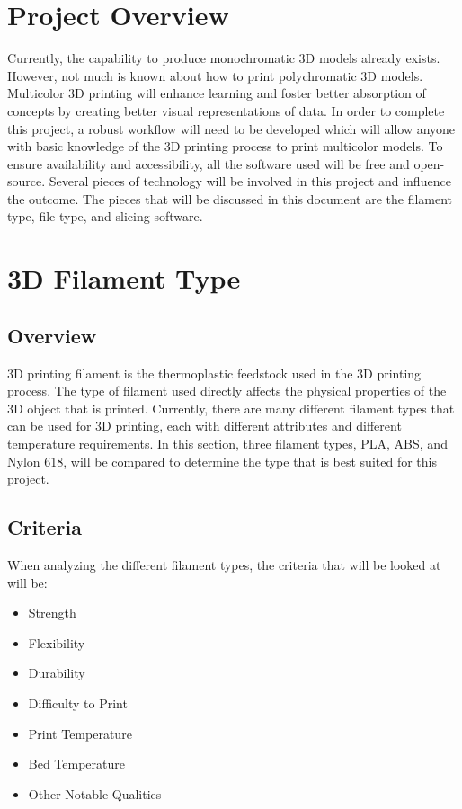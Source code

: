 \documentclass[letterpaper, onecolumn, draftclsnofoot,10pt, compsoc]{IEEEtran}
\begin{document}
\newpage
{}
\tableofcontents
\clearpage

\section{Project Overview} 
Currently, the capability to produce monochromatic 3D models already exists. 
However, not much is known about how to print polychromatic 3D models.
Multicolor 3D printing will enhance learning and foster better absorption of concepts by creating better visual representations of data. 
In order to complete this project, a robust workflow will need to be developed which will allow anyone with basic knowledge of the 3D printing process to print multicolor models.
To ensure availability and accessibility, all the software used will be free and open-source.
Several pieces of technology will be involved in this project and influence the outcome. 
The pieces that will be discussed in this document are the filament type, file type, and slicing software.


\section{3D Filament Type}
\subsection{Overview}
3D printing filament is the thermoplastic feedstock used in the 3D printing process.
The type of filament used directly affects the physical properties of the 3D object that is printed. 
Currently, there are many different filament types that can be used for 3D printing, each with different attributes and different temperature requirements.
In this section, three filament types, PLA, ABS, and Nylon 618, will be compared to determine the type that is best suited for this project. 
\subsection{Criteria}
When analyzing the different filament types, the criteria that will be looked at will be: 
\begin{itemize}
\item Strength
\item Flexibility
\item Durability
\item Difficulty to Print
\item Print Temperature
\item Bed Temperature
\item Other Notable Qualities
\end{itemize}
\end{document}
